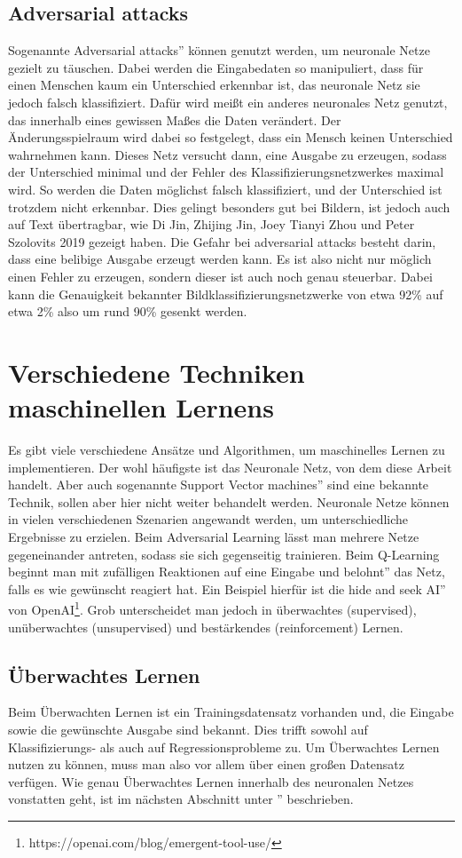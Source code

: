 \documentclass[11pt]{article}
\begin{document}
\subsection{Adversarial attacks}
Sogenannte \glqq Adversarial attacks'' können genutzt werden, um neuronale Netze gezielt zu täuschen. Dabei werden die Eingabedaten so manipuliert, dass für einen Menschen kaum ein Unterschied erkennbar ist, das neuronale Netz sie jedoch falsch klassifiziert. Dafür wird meißt ein anderes neuronales Netz genutzt, das innerhalb eines gewissen Maßes die Daten verändert. Der Änderungsspielraum wird dabei so festgelegt, dass ein Mensch keinen Unterschied wahrnehmen kann. Dieses Netz versucht dann, eine Ausgabe zu erzeugen, sodass der Unterschied minimal und der Fehler des Klassifizierungsnetzwerkes maximal wird. So werden die Daten möglichst falsch klassifiziert, und der Unterschied ist trotzdem nicht erkennbar. Dies gelingt besonders gut bei Bildern, ist jedoch auch auf Text übertragbar, wie Di Jin, Zhijing Jin, Joey Tianyi Zhou und Peter Szolovits 2019 gezeigt haben\cite{8}. Die Gefahr bei adversarial attacks besteht darin, dass eine belibige Ausgabe erzeugt werden kann. Es ist also nicht nur möglich einen Fehler zu erzeugen, sondern dieser ist auch noch genau steuerbar. Dabei kann die Genauigkeit bekannter Bildklassifizierungsnetzwerke von etwa 92\% auf etwa 2\% also um rund 90\% gesenkt werden\cite{9}. 
\section{Verschiedene Techniken maschinellen Lernens}\label{sec:verschiedene-techniken-maschinellen-lernens}
Es gibt viele verschiedene Ansätze und Algorithmen, um maschinelles Lernen zu implementieren. Der wohl häufigste ist das Neuronale Netz, von dem diese Arbeit handelt. Aber auch sogenannte \glqq Support Vector machines'' sind eine bekannte Technik, sollen aber hier nicht weiter behandelt werden. Neuronale Netze können in vielen verschiedenen Szenarien angewandt werden, um unterschiedliche Ergebnisse zu erzielen. Beim Adversarial Learning lässt man mehrere Netze gegeneinander antreten, sodass sie sich gegenseitig trainieren. Beim Q-Learning beginnt man mit zufälligen Reaktionen auf eine Eingabe und \glqq belohnt'' das Netz, falls es wie gewünscht reagiert hat. Ein Beispiel hierfür ist die \glqq hide and seek AI'' von OpenAI\footnote{https://openai.com/blog/emergent-tool-use/}. Grob unterscheidet man jedoch in überwachtes (supervised), unüberwachtes (unsupervised) und bestärkendes (reinforcement) Lernen.
\subsection{Überwachtes Lernen}
Beim Überwachten Lernen ist ein Trainingsdatensatz vorhanden und, die Eingabe sowie die gewünschte Ausgabe sind bekannt. Dies trifft sowohl auf Klassifizierungs- als auch auf Regressionsprobleme zu. Um Überwachtes Lernen nutzen zu können, muss man also vor allem über einen großen Datensatz verfügen. Wie genau Überwachtes Lernen innerhalb des neuronalen Netzes vonstatten geht, ist im nächsten Abschnitt unter \glqq{}'' beschrieben.
\end{document}
